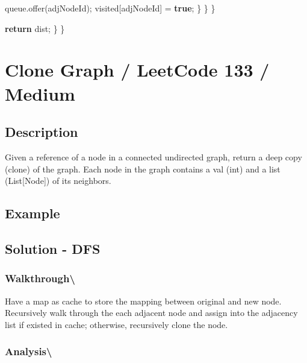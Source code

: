 \documentclass[]{book}
\newenvironment{Shaded}{\begin{snugshade}}{\end{snugshade}}
\newcommand{\FunctionTok}[1]{\textcolor[rgb]{0.00,0.00,0.00}{#1}}
\newcommand{\KeywordTok}[1]{\textcolor[rgb]{0.13,0.29,0.53}{\textbf{#1}}}
\newcommand{\NormalTok}[1]{#1}
\begin{document}
\begin{Shaded}
\begin{Highlighting}[]
\NormalTok{                    queue.}\FunctionTok{offer}\NormalTok{(adjNodeId);}
\NormalTok{                    visited[adjNodeId] = }\KeywordTok{true}\NormalTok{;}
\NormalTok{                \}}
\NormalTok{            \}}
\NormalTok{        \}}

        \KeywordTok{return}\NormalTok{ dist;}
\NormalTok{    \}}
\NormalTok{\}}
\end{Highlighting}
\end{Shaded}

\hypertarget{clone-graph-leetcode-133-medium}{%
\section{Clone Graph / LeetCode 133 / Medium}\label{clone-graph-leetcode-133-medium}}

\hypertarget{description-82}{%
\subsection{Description}\label{description-82}}

Given a reference of a node in a connected undirected graph, return a deep copy (clone) of the graph. Each node in the
graph contains a val (int) and a list (List{[}Node{]}) of its neighbors.

\hypertarget{example-78}{%
\subsection{Example}\label{example-78}}

\hypertarget{solution---dfs-4}{%
\subsection{Solution - DFS}\label{solution---dfs-4}}

\hypertarget{walkthrough-93}{%
\subsubsection{Walkthrough\textbackslash{}}\label{walkthrough-93}}

Have a map as cache to store the mapping between original and new node. Recursively walk through the each adjacent node
and assign into the adjacency list if existed in cache; otherwise, recursively clone the node.

\hypertarget{analysis-100}{%
\subsubsection{Analysis\textbackslash{}}\label{analysis-100}}
\end{document}
